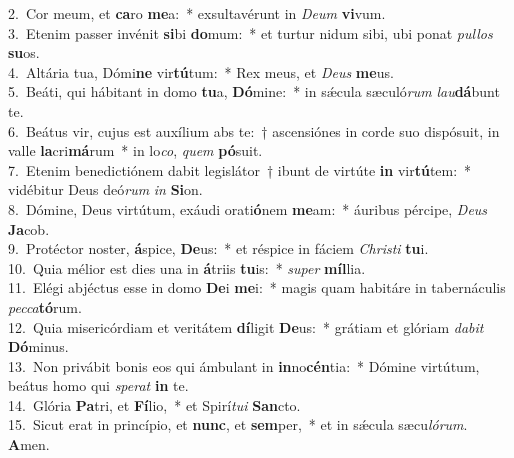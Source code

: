 {2.~}Cor meum, et \textbf{ca}ro \textbf{me}a:~* exsultavérunt in \textit{De}\textit{um} \textbf{vi}vum.\\
{3.~}Etenim passer invénit \textbf{si}bi \textbf{do}mum:~* et turtur nidum sibi, ubi ponat \textit{pul}\textit{los} \textbf{su}os.\\
{4.~}Altária tua, Dómi\textbf{ne} vir\textbf{tú}tum:~* Rex meus, et \textit{De}\textit{us} \textbf{me}us.\\
{5.~}Beáti, qui hábitant in domo \textbf{tu}a, \textbf{Dó}mine:~* in sǽcula sæculó\textit{rum} \textit{lau}\textbf{dá}bunt te.\\
{6.~}Beátus vir, cujus est auxílium abs te:~† ascensiónes in corde suo dispósuit, in valle \textbf{la}cri\textbf{má}rum~* in lo\textit{co}, \textit{quem} \textbf{pó}suit.\\
{7.~}Etenim benedictiónem dabit legislátor~† ibunt de virtúte \textbf{in} vir\textbf{tú}tem:~* vidébitur Deus deó\textit{rum} \textit{in} \textbf{Si}on.\\
{8.~}Dómine, Deus virtútum, exáudi orati\textbf{ó}nem \textbf{me}am:~* áuribus pércipe, \textit{De}\textit{us} \textbf{Ja}cob.\\
{9.~}Protéctor noster, \textbf{á}spice, \textbf{De}us:~* et réspice in fáciem \textit{Chri}\textit{sti} \textbf{tu}i.\\
{10.~}Quia mélior est dies una in \textbf{á}triis \textbf{tu}is:~* \textit{su}\textit{per} \textbf{míl}lia.\\
{11.~}Elégi abjéctus esse in domo \textbf{De}i \textbf{me}i:~* magis quam habitáre in tabernáculis \textit{pec}\textit{ca}\textbf{tó}rum.\\
{12.~}Quia misericórdiam et veritátem \textbf{dí}ligit \textbf{De}us:~* grátiam et glóriam \textit{da}\textit{bit} \textbf{Dó}minus.\\
{13.~}Non privábit bonis eos qui ámbulant in \textbf{in}no\textbf{cén}tia:~* Dómine virtútum, beátus homo qui \textit{spe}\textit{rat} \textbf{in} te.\\
{14.~}Glória \textbf{Pa}tri, et \textbf{Fí}lio,~* et Spirí\textit{tu}\textit{i} \textbf{San}cto.\\
{15.~}Sicut erat in princípio, et \textbf{nunc}, et \textbf{sem}per,~* et in sǽcula sæcu\textit{ló}\textit{rum}. \textbf{A}men.\\

